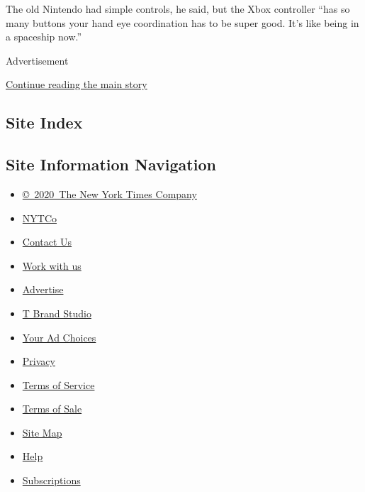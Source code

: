 The old Nintendo had simple controls, he said, but the Xbox controller
``has so many buttons your hand eye coordination has to be super good.
It's like being in a spaceship now.''

Advertisement

\protect\hyperlink{after-bottom}{Continue reading the main story}

\hypertarget{site-index}{%
\subsection{Site Index}\label{site-index}}

\hypertarget{site-information-navigation}{%
\subsection{Site Information
Navigation}\label{site-information-navigation}}

\begin{itemize}
\tightlist
\item
  \href{https://help.nytimes3xbfgragh.onion/hc/en-us/articles/115014792127-Copyright-notice}{©~2020~The
  New York Times Company}
\end{itemize}

\begin{itemize}
\tightlist
\item
  \href{https://www.nytco.com/}{NYTCo}
\item
  \href{https://help.nytimes3xbfgragh.onion/hc/en-us/articles/115015385887-Contact-Us}{Contact
  Us}
\item
  \href{https://www.nytco.com/careers/}{Work with us}
\item
  \href{https://nytmediakit.com/}{Advertise}
\item
  \href{http://www.tbrandstudio.com/}{T Brand Studio}
\item
  \href{https://www.nytimes3xbfgragh.onion/privacy/cookie-policy\#how-do-i-manage-trackers}{Your
  Ad Choices}
\item
  \href{https://www.nytimes3xbfgragh.onion/privacy}{Privacy}
\item
  \href{https://help.nytimes3xbfgragh.onion/hc/en-us/articles/115014893428-Terms-of-service}{Terms
  of Service}
\item
  \href{https://help.nytimes3xbfgragh.onion/hc/en-us/articles/115014893968-Terms-of-sale}{Terms
  of Sale}
\item
  \href{https://spiderbites.nytimes3xbfgragh.onion}{Site Map}
\item
  \href{https://help.nytimes3xbfgragh.onion/hc/en-us}{Help}
\item
  \href{https://www.nytimes3xbfgragh.onion/subscription?campaignId=37WXW}{Subscriptions}
\end{itemize}
